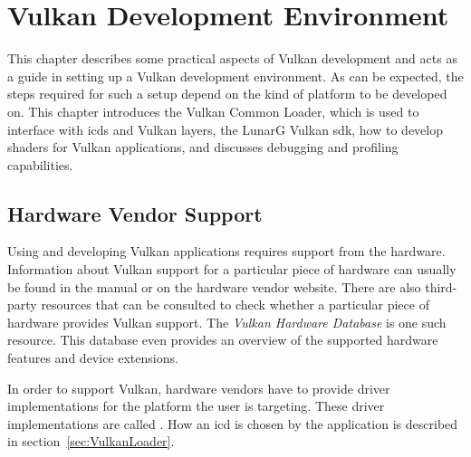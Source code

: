 
\chapter{Vulkan Development Environment}
\label{cha:EnvSetup}




  This chapter describes some practical aspects of Vulkan development and acts as a guide in setting up a Vulkan development environment. As can be expected, the steps required for such a setup depend on the kind of platform to be developed on. This chapter introduces the Vulkan Common Loader, which is used to interface with \glspl{icd} and Vulkan layers, the LunarG Vulkan \gls{sdk}, how to develop shaders for Vulkan applications, and discusses debugging and profiling capabilities.

  \section{Hardware Vendor Support}
  \label{sec:HardwareVendorSupport}
    Using and developing Vulkan applications requires support from the hardware. Information about Vulkan support for a particular piece of hardware can usually be found in the manual or on the hardware vendor website. There are also third-party resources that can be consulted to check whether a particular piece of hardware provides Vulkan support. The \textit{Vulkan Hardware Database}\cite{vulkangpuinfo} is one such resource. This database even provides an overview of the supported hardware features and device extensions.

    In order to support Vulkan, hardware vendors have to provide driver implementations for the platform the user is targeting. These driver implementations are called . How an \gls{icd} is chosen by the application is described in section~\ref{sec:VulkanLoader}.

